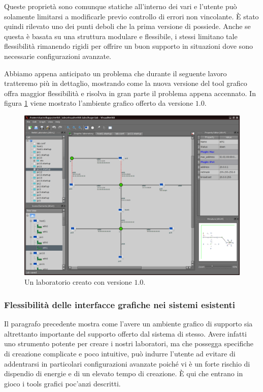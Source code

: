 Queste proprietà sono comunque statiche all'interno dei vari \plugin{} e l'utente può solamente limitarsi a modificarle previo controllo di errori non vincolante. È stato quindi rilevato uno dei punti deboli che la prima versione di \visualnetkit{} possiede. Anche se questa è basata su una struttura modulare e flessibile, i \plugin{} stessi limitano tale flessibilità rimanendo rigidi per offrire un buon supporto in situazioni dove sono necessarie configurazioni avanzate.

Abbiamo appena anticipato un problema che durante il seguente lavoro tratteremo più in dettaglio, mostrando come la nuova versione del tool grafico offra maggior flessibilità e risolva in gran parte il problema appena accennato. In figura \ref{figura:vn_main_1} viene mostrato l'ambiente grafico offerto da \visualnetkit{} versione $1.0$.

\begin{figure}[!ht]
	\centering
	\includegraphics[width=12cm]{images/visualnetkit_main_1.png}
	\caption{Un laboratorio creato con \visualnetkit{} versione $1.0$.}
	\label{figura:vn_main_1}
\end{figure}

\subsubsection{Flessibilità delle interfacce grafiche nei sistemi esistenti}
Il paragrafo precedente mostra come l'avere un ambiente grafico di supporto sia altrettanto importante del supporto offerto dal sistema di \emulazione{} stesso. Avere infatti uno strumento potente per creare i nostri laboratori, ma che possegga specifiche di creazione complicate e poco intuitive, può indurre l'utente ad evitare di addentrarsi in particolari configurazioni avanzate poiché vi è un forte rischio di dispendio di energie e di un elevato tempo di creazione.
È qui che entrano in gioco i tools grafici poc'anzi descritti.

